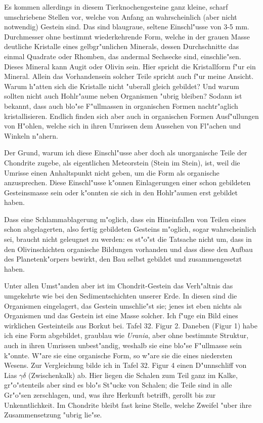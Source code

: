 \documentclass[a4paper, 11pt, oneside]{article}
\begin{document}
Es kommen allerdings in diesem Tierknochengesteine ganz kleine, scharf umschriebene Stellen vor, welche von Anfang an wahrscheinlich (aber nicht notwendig) Gestein sind. Das sind blaugraue, seltene Einschl"usse von 3-5 mm. Durchmesser ohne bestimmt wiederkehrende Form, welche in der grauen Masse deutliche Kristalle eines gelbgr"unlichen Minerals, dessen Durchschnitte das einmal Quadrate oder Rhomben, das andermal Sechsecke sind, einschlie"sen. Dieses Mineral kann Augit oder Olivin sein. Hier spricht die Kristallform f"ur ein Mineral. Allein das Vorhandensein solcher Teile spricht auch f"ur meine Ansicht. Warum h"atten sich die Kristalle nicht "uberall gleich gebildet? Und warum sollten nicht auch Hohlr"aume neben Organismen "ubrig bleiben? Sodann ist bekannt, dass auch blo"se F"ullmassen in organischen Formen nachtr"aglich kristallisieren. Endlich finden sich aber auch in organischen Formen Ausf"ullungen von H"ohlen, welche sich in ihren Umrissen dem Aussehen von Fl"achen und Winkeln n"ahern.

Der Grund, warum ich diese Einschl"usse aber doch als unorganische Teile der Chondrite zugebe, als eigentlichen Meteorstein (Stein im Stein), ist, weil die Umrisse einen Anhaltspunkt nicht geben, um die Form als organische anzusprechen. Diese Einschl"usse k"onnen Einlagerungen einer schon gebildeten Gesteinsmasse sein oder k"onnten sie sich in den Hohlr"aumen erst gebildet haben.

Dass eine Schlammablagerung m"oglich, dass ein Hineinfallen von Teilen eines schon abgelagerten, also fertig gebildeten Gesteins m"oglich, sogar wahrscheinlich sei, braucht nicht geleugnet zu werden: es st"o"st die Tatsache nicht um, dass in den Olivinschichten organische Bildungen vorhanden und dass diese den Aufbau des Planetenk"orpers bewirkt, den Bau selbst gebildet und zusammengesetzt haben.

Unter allen Umst"anden aber ist im Chondrit-Gestein das Verh"altnis das umgekehrte wie bei den Sedimentschichten unserer Erde. In diesen sind die Organismen eingelagert, das Gestein umschlie"st sie; jenes ist eben nichts als Organismen und das Gestein ist eine Masse solcher. Ich f"uge ein Bild eines wirklichen Gesteinteils aus Borkut bei. Tafel 32. Figur 2. Daneben (Figur 1) habe ich eine Form abgebildet, graublau wie \emph{Urania}, aber ohne bestimmte Struktur, auch in ihren Umrissen unbest"andig, weshalb sie eine blo"se F"ullmasse sein k"onnte. W"are sie eine organische Form, so w"are sie die eines niedersten Wesens. Zur Vergleichung bilde ich in Tafel 32. Figur 4 einen D"unnschliff von Lias $\gamma\delta$ (Zwischenkalk) ab. Hier liegen die Schalen zum Teil ganz im Kalke, gr"o"stenteils aber sind es blo"s St"ucke von Schalen; die Teile sind in alle Gr"o"sen zerschlagen, und, was ihre Herkunft betrifft, gerollt bis zur Unkenntlichkeit. Im Chondrite bleibt fast keine Stelle, welche Zweifel "uber ihre Zusammensetzung "ubrig lie"se.
\clearpage
\end{document}
